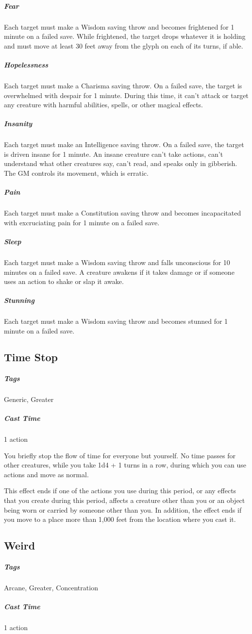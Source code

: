 \subparagraph{Fear} Each target must make a Wisdom saving throw and becomes frightened for 1 minute on a failed save. While frightened, the target drops whatever it is holding and must move at least 30 feet away from the glyph on each of its turns, if able.

\subparagraph{Hopelessness} Each target must make a Charisma saving throw. On a failed save, the target is overwhelmed with despair for 1 minute. During this time, it can’t attack or target any creature with harmful abilities, spells, or other magical effects.

\subparagraph{Insanity} Each target must make an Intelligence saving throw. On a failed save, the target is driven insane for 1 minute. An insane creature can’t take actions, can’t understand what other creatures say, can’t read, and speaks only in gibberish. The GM controls its movement, which is erratic.

\subparagraph{Pain} Each target must make a Constitution saving throw and becomes incapacitated with excruciating pain for 1 minute on a failed save.

\subparagraph{Sleep} Each target must make a Wisdom saving throw and falls unconscious for 10 minutes on a failed save. A creature awakens if it takes damage or if someone uses an action to shake or slap it awake.

\subparagraph{Stunning} Each target must make a Wisdom saving throw and becomes stunned for 1 minute on a failed save.

\subsection{Time Stop\label{spell:time-stop}}
\subparagraph*{Tags} Generic, Greater
\subparagraph*{Cast Time} 1 action

You briefly stop the flow of time for everyone but yourself. No time passes for other creatures, while you take 1d4 + 1 turns in a row, during which you can use actions and move as normal.

This effect ends if one of the actions you use during this period, or any effects that you create during this period, affects a creature other than you or an object being worn or carried by someone other than you. In addition, the effect ends if you move to a place more than 1,000 feet from the location where you cast it.

\subsection{Weird\label{spell:weird}}
\subparagraph*{Tags} Arcane, Greater, Concentration
\subparagraph*{Cast Time} 1 action

